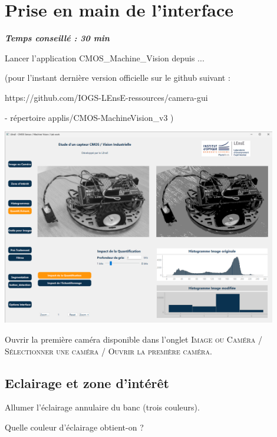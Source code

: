 \documentclass[a4paper,11pt,titlepage]{article} %
\begin{document}

\section{Prise en main de l'interface}

\begin{center} \textbf{\textit{Temps conseillé : 30 min}} \end{center}

\Manip Lancer l'application CMOS\_Machine\_Vision depuis ...

(pour l'instant dernière version officielle sur le github suivant : 

https://github.com/IOGS-LEnsE-ressources/camera-gui  

-  répertoire applis/CMOS-MachineVision\_v3  )

\begin{center}
	\includegraphics[width=0.9\textwidth]{./images/camera_gui.png}
\end{center}


\Manip Ouvrir la première caméra disponible dans l'onglet \textsc{Image ou Caméra} / \textsc{Sélectionner une caméra} / \textsc{Ouvrir la première caméra}.

\subsection{Eclairage et zone d'intérêt}

\Manip Allumer l'éclairage annulaire du banc (trois couleurs). 

\Quest Quelle couleur d'éclairage obtient-on ?
\end{document}
